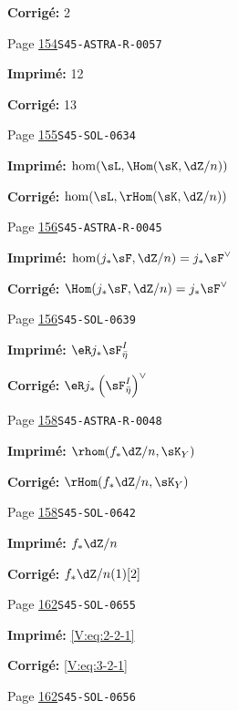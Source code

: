 \begin{description}
\par\noindent\textbf{Corrigé:} 2
\smallskip
\item[\hypertarget{apparatus:FR-0124}{124}] Page \hyperlink{printpage:fr:154}{154}\quad\texttt{S45-ASTRA-R-0057}
\par\noindent\textbf{Imprimé:} 12
\par\noindent\textbf{Corrigé:} 13
\smallskip
\item[\hypertarget{apparatus:FR-0125}{125}] Page \hyperlink{printpage:fr:155}{155}\quad\texttt{S45-SOL-0634}
\par\noindent\textbf{Imprimé:} \(\hom(\sL,\Hom(\sK,\dZ/n))\)
\par\noindent\textbf{Corrigé:} \(\hom(\sL,\rHom(\sK,\dZ/n))\)
\smallskip
\item[\hypertarget{apparatus:FR-0126}{126}] Page \hyperlink{printpage:fr:156}{156}\quad\texttt{S45-ASTRA-R-0045}
\par\noindent\textbf{Imprimé:} \(\hom(j_\ast\sF,\dZ/n)=j_\ast\sF^\vee\)
\par\noindent\textbf{Corrigé:} \(\Hom(j_\ast\sF,\dZ/n)=j_\ast\sF^\vee\)
\smallskip
\item[\hypertarget{apparatus:FR-0127}{127}] Page \hyperlink{printpage:fr:156}{156}\quad\texttt{S45-SOL-0639}
\par\noindent\textbf{Imprimé:} \(\eR j_\ast \sF_{\bar\eta}^I\)
\par\noindent\textbf{Corrigé:} \(\eR j_\ast\left(\sF_{\bar\eta}^I\right)^\vee\)
\smallskip
\item[\hypertarget{apparatus:FR-0128}{128}] Page \hyperlink{printpage:fr:158}{158}\quad\texttt{S45-ASTRA-R-0048}
\par\noindent\textbf{Imprimé:} \(\rhom(f_\ast\dZ/n,\sK_Y)\)
\par\noindent\textbf{Corrigé:} \(\rHom(f_\ast\dZ/n,\sK_Y)\)
\smallskip
\item[\hypertarget{apparatus:FR-0129}{129}] Page \hyperlink{printpage:fr:158}{158}\quad\texttt{S45-SOL-0642}
\par\noindent\textbf{Imprimé:} \(f_\ast\dZ/n\)
\par\noindent\textbf{Corrigé:} \(f_\ast\dZ/n(1)[2]\)
\smallskip
\item[\hypertarget{apparatus:FR-0130}{130}] Page \hyperlink{printpage:fr:162}{162}\quad\texttt{S45-SOL-0655}
\par\noindent\textbf{Imprimé:} \eqref{V:eq:2-2-1}
\par\noindent\textbf{Corrigé:} \eqref{V:eq:3-2-1}
\smallskip
\item[\hypertarget{apparatus:FR-0131}{131}] Page \hyperlink{printpage:fr:162}{162}\quad\texttt{S45-SOL-0656}

\end{description}
